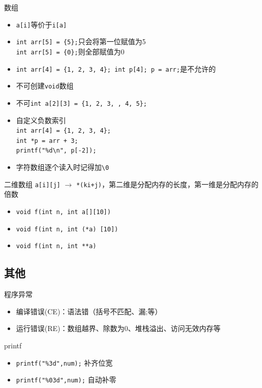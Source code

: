 \documentclass[UTF8]{ctexbeamer}
\begin{document}
\begin{frame}[fragile]{数组}
\begin{itemize}[<+->]
	\item \verb'a[i]'等价于\verb'i[a]'
	\item \verb'int arr[5] = {5};'只会将第一位赋值为5\\
		\verb'int arr[5] = {0};'则全部赋值为0
	\item \verb'int arr[4] = {1, 2, 3, 4}; int p[4]; p = arr;'是不允许的
	\item 不可创建\verb'void'数组
	\item 不可\verb'int a[2][3] = {1, 2, 3, , 4, 5};'
	\item 自定义负数索引\\
		\verb'int arr[4] = {1, 2, 3, 4};'\\
		\verb'int *p = arr + 3;'\\
		\verb'printf("%d\n", p[-2]);'
	\item 字符数组逐个读入时记得加\verb'\0'
\end{itemize}
\end{frame}

\begin{frame}[fragile]{二维数组}
\verb'a[i][j]' $\to$ \verb'*(ki+j)'，第二维是分配内存的长度，第一维是分配内存的倍数
\begin{itemize}
	\item \verb'void f(int n, int a[][10])'
	\item \verb'void f(int n, int (*a) [10])'
	\item \verb'void f(int n, int **a)'
\end{itemize}
\end{frame}

\subsection{其他}
\begin{frame}
\subsectionpage
\end{frame}

\begin{frame}{程序异常}
\begin{itemize}
	\item 编译错误(CE)：语法错（括号不匹配、漏;等）
	\item 运行错误(RE)：数组越界、除数为0、堆栈溢出、访问无效内存等
\end{itemize}
\end{frame}

\begin{frame}[fragile]{printf}
\begin{itemize}
	\item \verb'printf("%3d",num);' 补齐位宽
	\item \verb'printf("%03d",num);' 自动补零
\end{itemize}
\end{frame}
\end{document}
